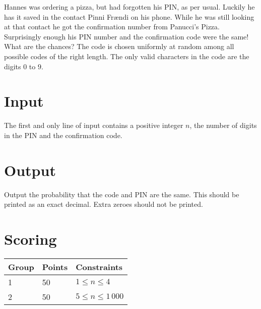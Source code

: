 
Hannes was ordering a pizza, but had forgotten his PIN, as per usual. Luckily he has it saved in the contact Pinni Frændi
on his phone. While he was still looking at that contact he got the confirmation number from Panucci's Pizza. Surprisingly
enough his PIN number and the confirmation code were the same! What are the chances? The code is chosen uniformly at random
among all possible codes of the right length. The only valid characters in the code are the digits $0$ to $9$.

\section*{Input}
The first and only line of input contains a positive integer $n$, the number of digits in the PIN and the confirmation code.

\section*{Output}
Output the probability that the code and PIN are the same. This should be printed as an exact decimal. Extra zeroes should not
be printed.

\section*{Scoring}
\begin{tabular}{|l|l|l|}
\hline
Group & Points & Constraints \\ \hline
1     & 50   & $1 \leq n \leq 4$ \\ \hline
2     & 50   & $5 \leq n \leq 1\,000$ \\ \hline
\end{tabular}

